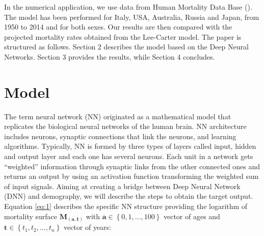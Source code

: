 \documentclass[a4,11pt]{article}
\begin{document}
In the numerical application, we use data from Human Mortality Data Base (\cite{HM}). The model has been performed for Italy, USA, Australia, Russia and Japan, from 1950 to 2014 and for both sexes. Our results are then compared with the projected mortality rates obtained from the Lee-Carter model.
The paper is structured as follows. Section 2 describes the model based on the Deep Neural Networks. Section 3 provides the results, while Section 4 concludes.

\section{Model}
	The term neural network (NN) originated as a mathematical model that replicates the biological neural networks of the human brain. NN architecture includes neurons, synaptic connections that link the neurons, and learning algorithms. Typically, NN is formed by three types of layers called input, hidden and output layer and each one has several neurons. Each unit in a network gets “weighted” information through synaptic links from the other connected ones and returns an output by using an activation function transforming the weighted sum of input signals. 
Aiming at creating a bridge between Deep Neural Network (DNN) and demography, we will describe the steps to obtain the target output.
Equation \ref{eq:1} describes the specific NN structure providing the logarithm of mortality surface $\mathbf{M_{(a,t)}}$ with $\mathbf{a}\in \left\{0,1,...,100\right\}$ vector of ages and $\mathbf{t}\in \left\{t_1,t_2,...,t_n\right\}$ vector of years:
\end{document}
